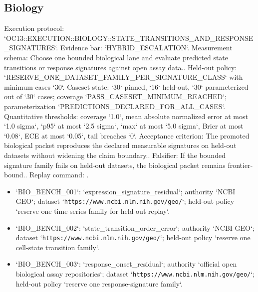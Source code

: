 \subsection{Biology}
Execution protocol: `OC13::EXECUTION::BIOLOGY::STATE\_TRANSITIONS\_AND\_RESPONSE\_SIGNATURES`. Evidence bar: `HYBRID\_ESCALATION`.
Measurement schema: Choose one bounded biological lane and evaluate predicted state transitions or response signatures against open assay data..
Held-out policy: `RESERVE\_ONE\_DATASET\_FAMILY\_PER\_SIGNATURE\_CLASS` with minimum cases `30`.
Caseset state: `30` pinned, `16` held-out, `30` parameterized out of `30` cases; coverage `PASS\_CASESET\_MINIMUM\_REACHED`; parameterization `PREDICTIONS\_DECLARED\_FOR\_ALL\_CASES`.
Quantitative thresholds: coverage `1.0`, mean absolute normalized error at most `1.0 sigma`, `p95` at most `2.5 sigma`, `max` at most `5.0 sigma`, Brier at most `0.08`, ECE at most `0.05`, tail breaches `0`.
Acceptance criterion: The promoted biological packet reproduces the declared measurable signatures on held-out datasets without widening the claim boundary..
Falsifier: If the bounded signature family fails on held-out datasets, the biological packet remains frontier-bound..
Replay command: .
\begin{itemize}
\item `BIO\_BENCH\_001`: `expression\_signature\_residual`; authority `NCBI GEO`; dataset `\texttt{https://www.ncbi.nlm.nih.gov/geo/}`; held-out policy `reserve one time-series family for held-out replay`.
\item `BIO\_BENCH\_002`: `state\_transition\_order\_error`; authority `NCBI GEO`; dataset `\texttt{https://www.ncbi.nlm.nih.gov/geo/}`; held-out policy `reserve one cell-state transition family`.
\item `BIO\_BENCH\_003`: `response\_onset\_residual`; authority `official open biological assay repositories`; dataset `\texttt{https://www.ncbi.nlm.nih.gov/geo/}`; held-out policy `reserve one response-signature family`.
\end{itemize}

